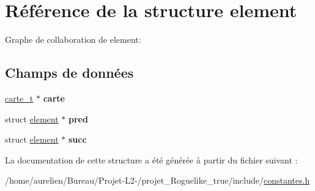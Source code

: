 \hypertarget{structelement}{}\section{Référence de la structure element}
\label{structelement}


Graphe de collaboration de element\+:
\subsection*{Champs de données}
\begin{DoxyCompactItemize}
\item 
\mbox{\label{structelement_a87516f31303f77028d0aa5a4d69214b6}} 
\hyperlink{structcarte__t}{carte\+\_\+t} $\ast$ {\bfseries carte}
\item 
\mbox{\label{structelement_a9f9ebee1fa1dce6d05bc325a66478635}} 
struct \hyperlink{structelement}{element} $\ast$ {\bfseries pred}
\item 
\mbox{\label{structelement_abe10f441a14a96bd130a004585b475ad}} 
struct \hyperlink{structelement}{element} $\ast$ {\bfseries succ}
\end{DoxyCompactItemize}


La documentation de cette structure a été générée à partir du fichier suivant \+:\begin{DoxyCompactItemize}
\item 
/home/aurelien/\+Bureau/\+Projet-\/\+L2-\//projet\+\_\+\+Roguelike\+\_\+true/include/\hyperlink{constantes_8h}{constantes.\+h}\end{DoxyCompactItemize}
